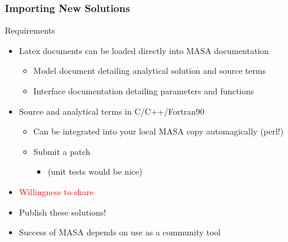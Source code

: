 \documentclass[mathserif]{beamer}
\begin{document}
\begin{frame}
  \frametitle{Importing New Solutions}

\begin{block}{Requirements}
  \begin{itemize}
  \item Latex documents can be loaded directly into MASA documentation
    \begin{itemize}    
      \item Model document detailing analytical solution and source terms
      \item Interface documentation detailing parameters and functions
    \end{itemize}
  \item Source and analytical terms in C/C++/Fortran90
    \begin{itemize}    
     \item Can be integrated into your local MASA copy automagically (perl!)
     \item Submit a patch
     \begin{itemize}    
      \item (unit tests would be nice)
     \end{itemize}
    \end{itemize}
   \item \textcolor{red}{Willingness to share}
   \item Publish these solutions!
  \end{itemize}
\end{block}

\begin{block}{}
  \begin{itemize}
    \item Success of MASA depends on use as a community tool
  \end{itemize}
\end{block}

\end{frame}
\end{document}
